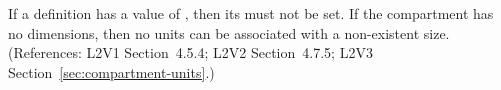 If a \Compartment definition has a  value
of , then its   must not be set. If the
compartment has no dimensions, then no units can be associated
with a non-existent size.  (References: L2V1 Section~4.5.4;
L2V2 Section~4.7.5; L2V3 Section~\ref{sec:compartment-units}.)
